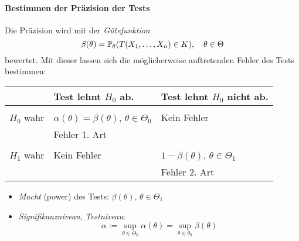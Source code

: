 \paragraph{Bestimmen der Präzision der Tests}
Die Präzision wird mit der \emph{Gütefunktion}
\[ \beta( \theta ) = \mathbb{P}_\theta( T(X_1, \ldots, X_n) \in K ), \quad \theta
  \in \Theta \]
bewertet. Mit dieser lassen sich die möglicherweise auftretenden Fehler des
Tests bestimmen:
\begin{center}
  \begin{tabular}{r|l|l}
    & Test lehnt $H_0$ ab. & Test lehnt $H_0$ nicht ab. \\
    \hline & \\
    $H_0$ wahr & $\alpha(\theta) = \beta(\theta)$, $\theta \in \Theta_0$ 
                           & Kein Fehler \\
    & Fehler 1. Art \\
    \hline & \\
    $H_1$ wahr & Kein Fehler & $1 - \beta(\theta)$, $\theta \in \Theta_1$ \\
    & & Fehler 2. Art
  \end{tabular}
\end{center}

\begin{itemize}
\item \emph{Macht} (power) des Tests: $\beta(\theta)$, $\theta \in \Theta_1$
\item \emph{Signifikanzniveau}, \emph{Testniveau}:
  \[ \alpha := \sup_{\theta \in \Theta_0} \alpha(\theta) = \sup_{\theta \in
      \theta_0} \beta(\theta) \]
\end{itemize}

